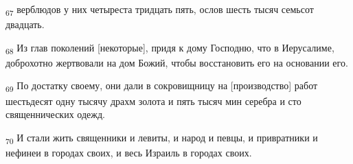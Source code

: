 \begin{tcolorbox}
\textsubscript{67} верблюдов у них четыреста тридцать пять, ослов шесть тысяч семьсот двадцать.
\end{tcolorbox}
\begin{tcolorbox}
\textsubscript{68} Из глав поколений [некоторые], придя к дому Господню, что в Иерусалиме, доброхотно жертвовали на дом Божий, чтобы восстановить его на основании его.
\end{tcolorbox}
\begin{tcolorbox}
\textsubscript{69} По достатку своему, они дали в сокровищницу на [производство] работ шестьдесят одну тысячу драхм золота и пять тысяч мин серебра и сто священнических одежд.
\end{tcolorbox}
\begin{tcolorbox}
\textsubscript{70} И стали жить священники и левиты, и народ и певцы, и привратники и нефинеи в городах своих, и весь Израиль в городах своих.
\end{tcolorbox}
